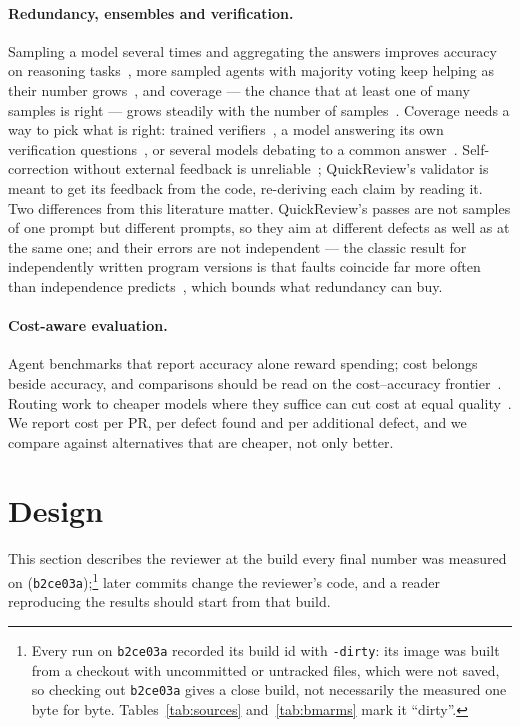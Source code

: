 \documentclass[11pt,a4paper]{article}
\newcommand{\qcr}{QuickReview}
\newcommand{\code}[1]{\texttt{#1}}
\begin{document}
\paragraph{Redundancy, ensembles and verification.} Sampling a model several
times and aggregating the answers improves accuracy on reasoning
tasks~\cite{selfconsistency}, more sampled agents with majority voting keep
helping as their number grows~\cite{moreagents}, and coverage --- the chance
that at least one of many samples is right --- grows steadily with the
number of samples~\cite{monkeys}. Coverage needs a way to pick what is
right: trained verifiers~\cite{cobbe2021}, a model answering its own
verification questions~\cite{cove}, or several models debating to a common
answer~\cite{debate}. Self-correction without external feedback is
unreliable~\cite{huang2024}; \qcr{}'s validator is meant to get its feedback
from the code, re-deriving each claim by reading it. Two differences from
this literature matter. \qcr{}'s passes are not samples of one prompt but
different prompts, so they aim at different defects as well as at the same
one; and their errors are not independent --- the classic result for
independently written program versions is that faults coincide far more
often than independence predicts~\cite{knight1986}, which bounds what
redundancy can buy.

\paragraph{Cost-aware evaluation.} Agent benchmarks that report accuracy
alone reward spending; cost belongs beside accuracy, and comparisons should
be read on the cost--accuracy frontier~\cite{kapoor2024}. Routing work to
cheaper models where they suffice can cut cost at equal
quality~\cite{frugalgpt}. We report cost per PR, per defect found and per
additional defect, and we compare against alternatives that are cheaper,
not only better.

\section{Design}
\label{sec:design}

This section describes the reviewer at the build every final number was
measured on (\code{b2ce03a});\footnote{\label{fn:dirty}Every run on
\code{b2ce03a} recorded its build id with \code{-dirty}: its image was
built from a checkout with uncommitted or untracked files, which were not
saved, so checking out \code{b2ce03a} gives a close build, not necessarily
the measured one byte for byte. Tables~\ref{tab:sources}
and~\ref{tab:bmarms} mark it ``dirty''.} later commits change the
reviewer's code, and a reader reproducing the results should start from
that build.
\end{document}

